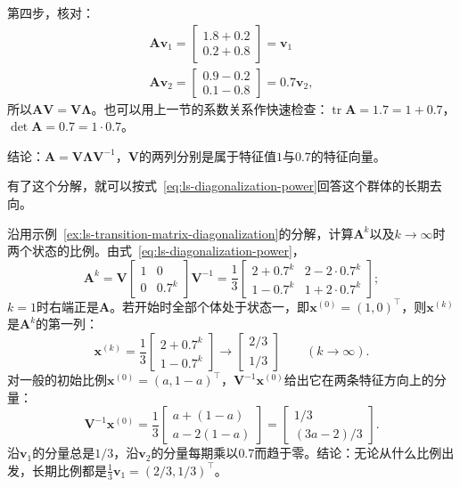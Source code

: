 \begin{example}[两状态转移矩阵的对角化]
第四步，核对：
\[
\begin{gathered}
\bm A\bm v_1=\begin{bmatrix}1.8+0.2\\0.2+0.8\end{bmatrix}=\bm v_1\\
\bm A\bm v_2=\begin{bmatrix}0.9-0.2\\0.1-0.8\end{bmatrix}=0.7\bm v_2,
\end{gathered}
\]
所以$\bm A\bm V=\bm V\bm\Lambda$。也可以用上一节的系数关系作快速检查：$\operatorname{tr}\bm A=1.7=1+0.7$，$\det\bm A=0.7=1\cdot0.7$。

结论：$\bm A=\bm V\bm\Lambda\bm V^{-1}$，$\bm V$的两列分别是属于特征值$1$与$0.7$的特征向量。
\end{example}

有了这个分解，就可以按式~\eqref{eq:ls-diagonalization-power}回答这个群体的长期去向。
\begin{example}[转移矩阵的长期比例]
\label{ex:ls-transition-matrix-long-run}
沿用示例~\ref{ex:ls-transition-matrix-diagonalization}的分解，计算$\bm A^k$以及$k\to\infty$时两个状态的比例。由式~\eqref{eq:ls-diagonalization-power}，
\[
 \bm A^k=\bm V\begin{bmatrix}1&0\\0&0.7^k\end{bmatrix}\bm V^{-1}
 =\frac13\begin{bmatrix}2+0.7^k&2-2\cdot0.7^k\\1-0.7^k&1+2\cdot0.7^k\end{bmatrix};
\]
$k=1$时右端正是$\bm A$。若开始时全部个体处于状态一，即$\bm x^{(0)}=(1,0)^{\top}$，则$\bm x^{(k)}$是$\bm A^k$的第一列：
\[
 \bm x^{(k)}=\frac13\begin{bmatrix}2+0.7^k\\1-0.7^k\end{bmatrix}
 \to\begin{bmatrix}2/3\\1/3\end{bmatrix}\qquad(k\to\infty).
\]
对一般的初始比例$\bm x^{(0)}=(a,1-a)^{\top}$，$\bm V^{-1}\bm x^{(0)}$给出它在两条特征方向上的分量：
\[
 \bm V^{-1}\bm x^{(0)}=\frac13\begin{bmatrix}a+(1-a)\\a-2(1-a)\end{bmatrix}=\begin{bmatrix}1/3\\(3a-2)/3\end{bmatrix}.
\]
沿$\bm v_1$的分量总是$1/3$，沿$\bm v_2$的分量每期乘以$0.7$而趋于零。结论：无论从什么比例出发，长期比例都是$\tfrac13\bm v_1=(2/3,1/3)^{\top}$。
\end{example}

